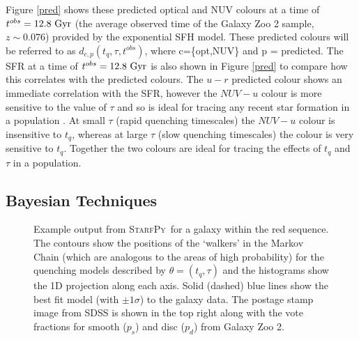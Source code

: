 \documentclass[useAMS,usenatbib]{mn2e}
\def\changed    {\color{titlecol} }
\def\starfpy {\textsc{StarfPy}}
\begin{document}
Figure \ref{pred} shows these predicted optical and NUV colours at a time of $t^{obs} = 12.8 ~\rm{Gyr}$ (the average observed time of the Galaxy Zoo 2 sample, $z \sim 0.076$) provided by the exponential SFH model. These predicted colours will be referred to as $d_{c,p}(t_{q}, \tau, t^{obs})$, where c=\{opt,NUV\} and p = predicted. The SFR at a time of $t^{obs}=12.8~\rm{Gyr}$ is also shown in Figure \ref{pred} to compare how this correlates with the predicted colours. The $u-r$ predicted colour shows an immediate correlation with the SFR, however the $NUV-u$ colour is more sensitive to the value of $\tau$ and so is ideal for tracing any recent star formation in a population . At small $\tau$ (rapid quenching timescales) the $NUV-u$ colour is insensitive to $t_{q}$, whereas at large $\tau$ (slow quenching timescales) the colour is very sensitive to $t_{q}$. Together the two colours are ideal for tracing the effects of $t_{q}$ and $\tau$ in a population. 




\subsection{Bayesian Techniques}\label{stats}

\begin{figure}
\caption{{\changed Example output from \starfpy ~for a galaxy within the red sequence. The contours show the positions of the `walkers' in the Markov Chain (which are analogous to the areas of high probability) for the quenching models described by $\theta = (t_q, \tau)$ and the histograms show the 1D projection along each axis. Solid (dashed) blue lines show the best fit model (with $\pm 1\sigma$) to the galaxy data. The postage stamp image from SDSS is shown in the top right along with the vote fractions for smooth ($p_s$) and disc ($p_d$) from Galaxy Zoo 2.} }
\label{one_example}
\end{figure}
\end{document}
